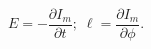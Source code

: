 \begin{equation}
\label{energy}
E=-\frac{\partial I_m}{\partial t};\;\ell = \frac{\partial I_m}{ \partial \phi}.
\end{equation}

